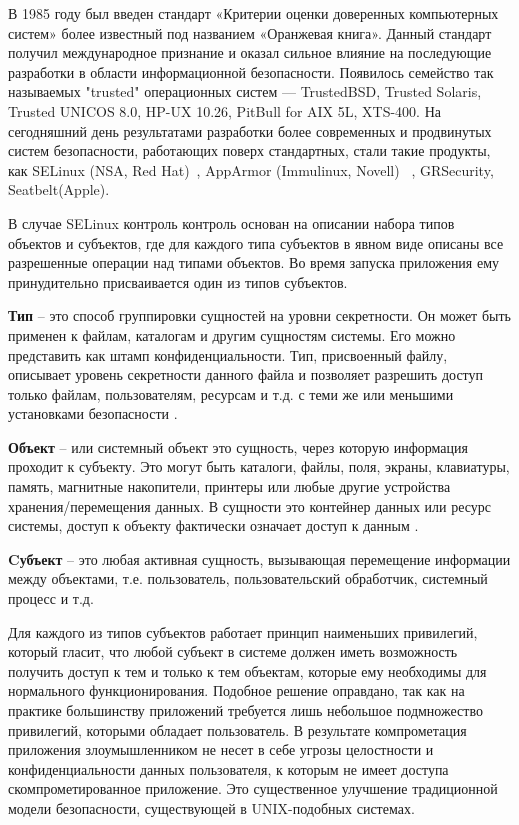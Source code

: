 В 1985 году был введен стандарт «Критерии 
оценки доверенных компьютерных систем» более известный 
под названием «Оранжевая книга». Данный стандарт получил 
международное признание и оказал сильное влияние на 
последующие разработки в области информационной безопасности. 
Появилось семейство так называемых "trusted" операционных 
систем — TrustedBSD, Trusted Solaris, Trusted UNICOS 8.0, 
HP-UX 10.26, PitBull for AIX 5L, XTS-400. На сегодняшний 
день результатами разработки 
более современных и продвинутых систем безопасности, 
работающих поверх стандартных, стали такие продукты, как 
SELinux (NSA, Red Hat)~\cite{SEOF}, AppArmor (Immulinux, Novell) 
~\cite{AppArmor},
GRSecurity\cite{pax}, Seatbelt(Apple).

В случае SELinux контроль контроль основан на
описании набора типов объектов и субъектов, где для
каждого типа субъектов в явном виде описаны все разрешенные
операции над типами объектов. Во время запуска приложения
ему принудительно присваивается один из типов субъектов.

\textbf{Тип} -- это способ группировки сущностей на уровни
        секретности. Он может быть применен к файлам,
        каталогам и другим сущностям системы. Его можно
        представить как штамп конфиденциальности.
        Тип, присвоенный файлу, описывает уровень
        секретности данного файла и позволяет разрешить
        доступ только файлам, пользователям, ресурсам и т.д.
        с теми же или меньшими установками безопасности \cite{selinux2}.

\textbf{Объект} -- или системный объект это сущность,
        через которую информация проходит к субъекту.
        Это могут быть каталоги, файлы, поля, экраны,
        клавиатуры, память, магнитные накопители,
        принтеры или любые другие устройства хранения/перемещения
        данных. В сущности это контейнер данных или ресурс
        системы, доступ к объекту фактически означает доступ к данным \cite{selinux2}.

\textbf{Cубъект} -- это любая активная сущность, вызывающая
        перемещение информации между объектами, т.е.
        пользователь, пользовательский обработчик,
        системный процесс и т.д. \cite{selinux2}

Для каждого из типов субъектов работает принцип наименьших
привилегий, который гласит, что любой субъект в системе
должен иметь возможность получить доступ к тем и только к
тем объектам, которые ему необходимы для нормального
функционирования. Подобное решение оправдано,
так как на практике большинству приложений требуется лишь
небольшое подмножество привилегий, которыми обладает
пользователь. В результате компрометация приложения
злоумышленником не несет в себе угрозы целостности
и конфиденциальности данных пользователя, к которым не
имеет доступа скомпрометированное приложение. Это
существенное улучшение традиционной
модели безопасности, существующей в UNIX-подобных системах.

